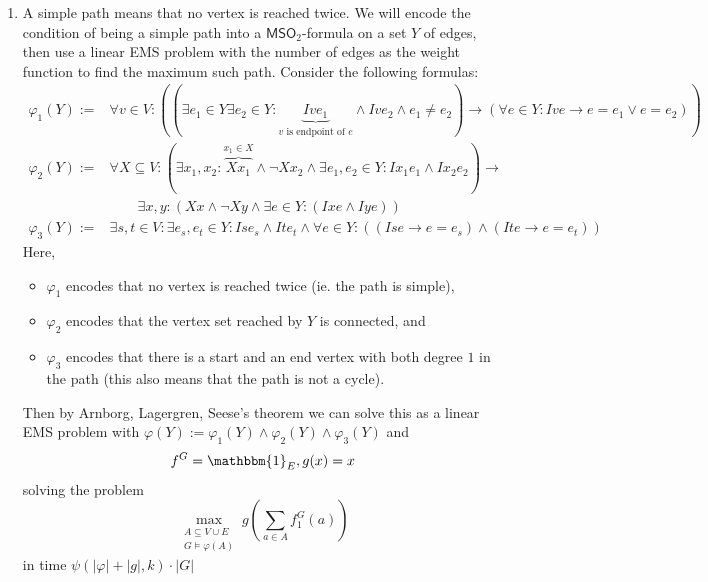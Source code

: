 \documentclass{article}
\begin{document}
\begin{solving}
    \begin{enumerate}
        \item A simple path means that no vertex is reached twice. We will encode the condition of being a simple path into a $\mathsf{MSO}_2$-formula on a set $Y$ of edges, then use a linear EMS problem with the number of edges as the weight function to find the maximum such path. Consider the following formulas:\begin{align*}
            \varphi_1 (Y) :=&
                \forall v\in V:
                \left(
                    \left(
                        \exists e_1\in Y\exists e_2\in Y: \underbrace{Ive_1}_{v\text{ is endpoint of }e}\land Ive_2 \land e_1\neq e_2
                    \right)
                    \to
                    \left(
                        \forall e\in Y: Ive\to e=e_1\lor e = e_2
                    \right)
                \right)\\
            \varphi_2 (Y) :=&
                \forall X\subseteq V: 
                \left(
                \exists x_1,x_2 : \overbrace{Xx_1}^{x_1\in X}\land \lnot Xx_2 \land \exists e_1,e_2\in Y: Ix_1e_1\land Ix_2 e_2
                \right)
                \to
                \\&\qquad\exists x,y: \left(Xx\land \lnot Xy \land \exists e\in Y: (Ixe\land Iye)\right) \\
            \varphi_3(Y) := & \exists s,t\in V: \exists e_s, e_t\in Y: Ise_s \land Ite_t\land \forall e\in Y: \left(\left( Ise\to e = e_s\right)\land \left(Ite\to e = e_t\right)\right)
        \end{align*}
        Here, \begin{itemize}
            \item $\varphi_1$ encodes that no vertex is reached twice (ie. the path is simple),
            \item $\varphi_2$ encodes that the vertex set reached by $Y$ is connected, and
            \item $\varphi_3$ encodes that there is a start and an end vertex with both degree $1$ in the path (this also means that the path is not a cycle).
        \end{itemize}
        Then by Arnborg, Lagergren, Seese's theorem we can solve this as a linear EMS problem with $\varphi(Y) := \varphi_1(Y)\land \varphi_2(Y)\land \varphi_3(Y)$ and\begin{align*}
            f^G = \mathbbm{1}_{E}, g(x) = x
        \end{align*} solving the problem \begin{equation*}
            \max_{\substack{A\subseteq V\cup E\\ G\models \varphi(A)}}g\left(\sum_{a\in A}f_1^G(a)\right)
        \end{equation*}
        in time $\psi(|\varphi| + |g|, k)\cdot |G|$


\end{enumerate}
\end{solving}
\end{document}
